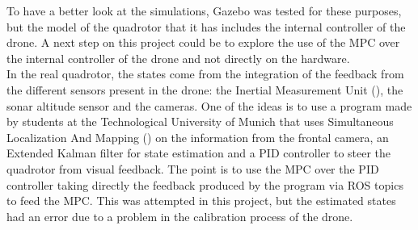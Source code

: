 To have a better look at the simulations, Gazebo was tested for these purposes, but the model of the quadrotor that it has includes the internal controller of the drone. A next step on this project could be to explore the use of the MPC over the internal controller of the drone and not directly on the hardware.\\

In the real quadrotor, the states come from the integration of the feedback from the different sensors present in the drone: the Inertial Measurement Unit (), the sonar altitude sensor and the cameras. One of the ideas is to use a program made by students at the Technological University of Munich that uses Simultaneous Localization And Mapping () on the information from the frontal camera, an Extended Kalman filter for state estimation and a PID controller to steer the quadrotor from visual feedback. The point is to use the MPC over the PID controller taking directly the feedback produced by the program via ROS topics to feed the MPC. This was attempted in this project, but the estimated states had an error due to a problem in the calibration process of the drone.\\











